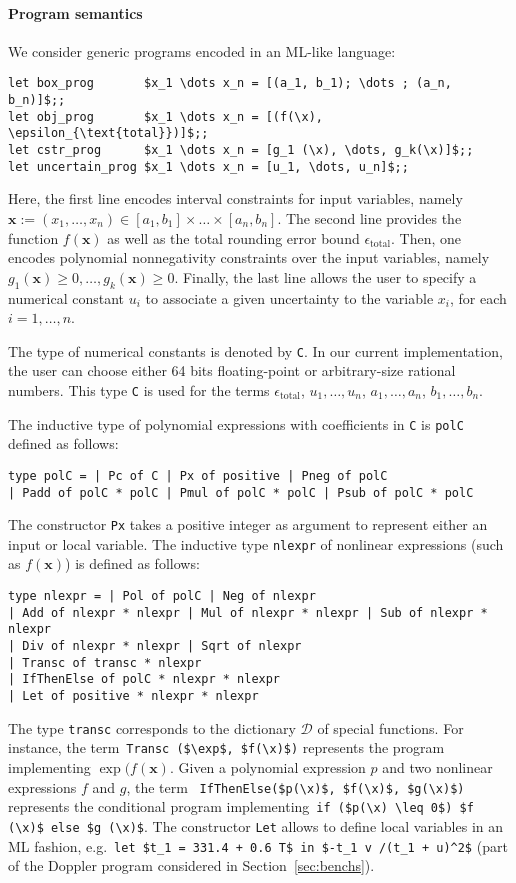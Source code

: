\documentclass[a4paper,10pt]{article}
\newcommand{\code}[1]{\lstinline{#1}}
\newcommand{\setD}{\mathcal{D}} %
\newcommand{\x}{\mathbf{x}}
\theoremstyle{plain}
\theoremstyle{definition}
\theoremstyle{remark}
\begin{document}
\paragraph{Program semantics}
%
We consider generic programs encoded in an ML-like language:
\begin{lstlisting}
let box_prog       $x_1 \dots x_n = [(a_1, b_1); \dots ; (a_n, b_n)]$;;
let obj_prog       $x_1 \dots x_n = [(f(\x), \epsilon_{\text{total}})]$;;
let cstr_prog      $x_1 \dots x_n = [g_1 (\x), \dots, g_k(\x)]$;;
let uncertain_prog $x_1 \dots x_n = [u_1, \dots, u_n]$;;
\end{lstlisting}
Here, the first line encodes interval constraints for input variables, namely $\x := (x_1, \dots, x_n) \in [a_1, b_1]\times \dots \times [a_n, b_n]$.
The second line provides the function $f(\x)$ as well as the total rounding error bound $\epsilon_{\text{total}}$.
Then, one encodes polynomial nonnegativity constraints over the input variables, namely $g_1(\x) \geq 0, \dots, g_k(\x) \geq 0$. Finally, the last line allows the user to specify a numerical constant $u_i$ to associate a given uncertainty to the variable $x_i$, for each $i= 1, \dots, n$.

The type of numerical constants is denoted by \code{C}. In our current implementation, the user can choose either 64 bits floating-point or arbitrary-size rational numbers. This type \code{C} is used for the terms $\epsilon_{\text{total}}$, $u_1, \dots, u_n$, $a_1, \dots, a_n$, $b_1, \dots, b_n$.

The inductive type of polynomial expressions with coefficients in \code{C} is \code{polC} defined as follows:
\begin{lstlisting}
type polC = | Pc of C | Px of positive | Pneg of polC
| Padd of polC * polC | Pmul of polC * polC | Psub of polC * polC
\end{lstlisting}
%
The constructor \code{Px} takes a positive integer as argument to represent either an input or local variable.
The inductive type \code{nlexpr} of nonlinear expressions (such as $f(\x)$) is defined as follows:
\begin{lstlisting}
type nlexpr = | Pol of polC | Neg of nlexpr
| Add of nlexpr * nlexpr | Mul of nlexpr * nlexpr | Sub of nlexpr * nlexpr 
| Div of nlexpr * nlexpr | Sqrt of nlexpr 
| Transc of transc * nlexpr
| IfThenElse of polC * nlexpr * nlexpr
| Let of positive * nlexpr * nlexpr
\end{lstlisting}
%
The type \code{transc} corresponds to the dictionary $\setD$ of special functions. For instance, the term~\lstinline|Transc ($\exp$, $f(\x)$)| represents the program implementing $\exp(f(\x)$.
Given a polynomial expression $p$ and two nonlinear expressions $f$ and $g$, the term ~\lstinline|IfThenElse($p(\x)$, $f(\x)$, $g(\x)$)| represents the conditional program implementing~\lstinline|if ($p(\x) \leq 0$) $f (\x)$ else $g (\x)$|. The constructor \code{Let} allows to define local variables in an ML fashion, e.g.~\lstinline|let $t_1 = 331.4 + 0.6 T$ in $-t_1 v /(t_1 + u)^2$| (part of the Doppler program considered in Section~\ref{sec:benchs}).
%
%
\end{document}

